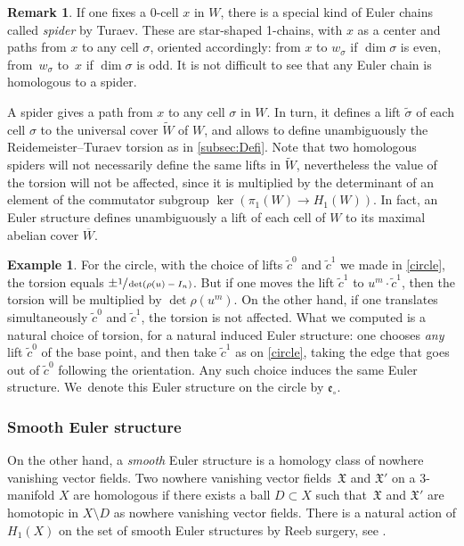 \documentclass[JEP,XML,SOM,Unicode,NoFloatCountersInSection,published]{cedram}
\theoremstyle{plain}
\theoremstyle{definition}
\newtheorem{rmrk}[thm]{Remark}
\newtheorem{example}[thm]{Example}
\theoremstyle{remark}
\numberwithin{equation}{section}
\begin{document}
\begin{rmrk}
If one fixes a $0$-cell $x$ in $W$, there is a special kind of Euler chains called \emph{spider} by Turaev. These are star-shaped 1-chains, with $x$ as a center and paths from $x$ to any cell $\sigma$, oriented accordingly: from $x$ to $w_\sigma$ if $\dim \sigma$ is even, from~$w_\sigma$ to~$x$ if $\dim \sigma$ is odd. It is not difficult to see that any Euler chain is homologous to a spider.

A spider gives a path from $x$ to any cell $\sigma$ in $W$. In turn, it defines a lift $\widetilde \sigma$ of each cell
$\sigma$ to the universal cover $\widetilde W$ of $W$, and allows to define unambiguously the Reidemeister--Turaev torsion as in \cref{subsec:Defi}. Note that two homologous spiders will not necessarily define the same lifts in $\widetilde W$, nevertheless the value of the torsion will not be affected, since it is multiplied by the determinant of an element of the commutator subgroup $\ker(\pi_1(W) \to H_1(W))$. In fact, an Euler structure defines unambiguously a lift of each cell of $W$ to its maximal abelian cover $\overline W$.
\end{rmrk}

\begin{example}\label{ex:circle2}
For the circle, with the choice of lifts $\widetilde c^0$ and $\widetilde c^1$ we made in \cref{circle}, the torsion equals $\pm \sfrac 1 {\det(\rho(u)-I_n)}$. But if one moves the lift $\widetilde c^1$ to $u^m \cdot \widetilde c^1$, then the torsion will be multiplied by $\det \rho(u^m)$.
On the other hand, if one translates {simultaneously} $\widetilde c^0$ and $\widetilde c^1$, the torsion is not affected.
What we computed is a natural choice of torsion, for a natural induced Euler structure: one chooses \emph{any} lift $\widetilde c^0$ of the base point, and then take $\widetilde c^1$ as on \cref{circle}, taking the edge that goes out of $\widetilde c^0$ following the orientation. Any such choice induces the same Euler structure.
We~denote this Euler structure on the circle by $\mathfrak e_{\circ}$.
\end{example}

\subsubsection{Smooth Euler structure}
On the other hand, a \emph{smooth} Euler structure is a homology class of nowhere vanishing vector fields. Two nowhere vanishing vector fields~$\mathfrak X$ and $\mathfrak X'$ on a 3\nobreakdash-manifold $X$ are homologous if there exists a ball $D \subset X$ such that~$\mathfrak X$ and $\mathfrak X'$ are homotopic in $X \setminus D$ as nowhere vanishing vector fields. There is a natural action of $H_1(X)$ on the set of smooth Euler structures by Reeb surgery, see \cite[\S I.4.2]{Turaev_tors}.
\end{document}
